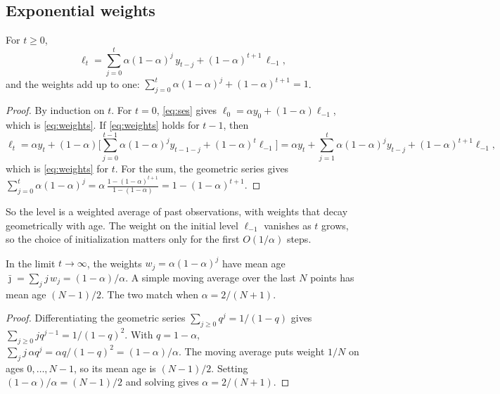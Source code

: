 \documentclass[11pt,a4paper]{article}
\begin{document}
\subsection{Exponential weights}

\begin{proposition}\label{prop:weights}
For $t\ge 0$,
\begin{equation}\label{eq:weights}
  \ell_t = \sum_{j=0}^{t} \alpha(1-\alpha)^j\, y_{t-j} + (1-\alpha)^{t+1}\,\ell_{-1},
\end{equation}
and the weights add up to one:
$\sum_{j=0}^{t}\alpha(1-\alpha)^j + (1-\alpha)^{t+1} = 1$.
\end{proposition}
\begin{proof}
By induction on $t$. For $t=0$, \eqref{eq:ses} gives $\ell_0=\alpha y_0+(1-\alpha)\ell_{-1}$,
which is \eqref{eq:weights}. If \eqref{eq:weights} holds for $t-1$, then
\[
  \ell_t = \alpha y_t + (1-\alpha)\Big[\sum_{j=0}^{t-1}\alpha(1-\alpha)^j y_{t-1-j} + (1-\alpha)^t\ell_{-1}\Big]
         = \alpha y_t + \sum_{j=1}^{t}\alpha(1-\alpha)^{j} y_{t-j} + (1-\alpha)^{t+1}\ell_{-1},
\]
which is \eqref{eq:weights} for $t$. For the sum, the geometric series gives
$\sum_{j=0}^{t}\alpha(1-\alpha)^j = \alpha\,\frac{1-(1-\alpha)^{t+1}}{1-(1-\alpha)} = 1-(1-\alpha)^{t+1}$.
\end{proof}

So the level is a weighted average of past observations, with weights that decay
geometrically with age. The weight on the initial level $\ell_{-1}$ vanishes as $t$ grows, so
the choice of initialization matters only for the first $O(1/\alpha)$ steps.

\begin{proposition}\label{prop:lag}
In the limit $t\to\infty$, the weights $w_j=\alpha(1-\alpha)^j$ have mean age
$\bar{\jmath} = \sum_j j\,w_j = (1-\alpha)/\alpha$. A simple moving average over
the last $N$ points has mean age $(N-1)/2$. The two match when
$\alpha = 2/(N+1)$.
\end{proposition}
\begin{proof}
Differentiating the geometric series $\sum_{j\ge0}q^j=1/(1-q)$ gives
$\sum_{j\ge0} j q^{j-1}=1/(1-q)^2$. With $q=1-\alpha$,
$\sum_j j\,\alpha q^j = \alpha q/(1-q)^2 = (1-\alpha)/\alpha$. The moving average
puts weight $1/N$ on ages $0,\dots,N-1$, so its mean age is $(N-1)/2$. Setting
$(1-\alpha)/\alpha=(N-1)/2$ and solving gives $\alpha=2/(N+1)$.
\end{proof}
\end{document}
